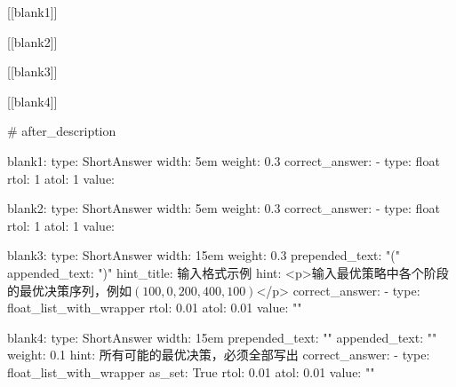 [[blank1]]

[[blank2]]

[[blank3]]

[[blank4]] 

 \#{ after_description }

blank1:
    type: ShortAnswer
    width: 5em
    weight: 0.3
    correct_answer:
    - type: float
      rtol: 1
      atol: 1
      value: 

blank2:
    type: ShortAnswer
    width: 5em
    weight: 0.3
    correct_answer:
    - type: float
      rtol: 1
      atol: 1
      value: 

blank3:
    type: ShortAnswer
    width: 15em
    weight: 0.3
    prepended_text: "("
    appended_text: ")"
    hint_title: 输入格式示例
    hint: <p>输入最优策略中各个阶段的最优决策序列，例如$(100, 0, 200, 400, 100)$</p>
    correct_answer:
    - type: float_list_with_wrapper
      rtol: 0.01
      atol: 0.01
      value: ""

blank4:
    type: ShortAnswer
    width: 15em
    prepended_text: "{"
    appended_text: "}"
    weight: 0.1
    hint: 所有可能的最优决策，必须全部写出
    correct_answer:
    - type: float_list_with_wrapper
      as_set: True
      rtol: 0.01
      atol: 0.01
      value: ""

